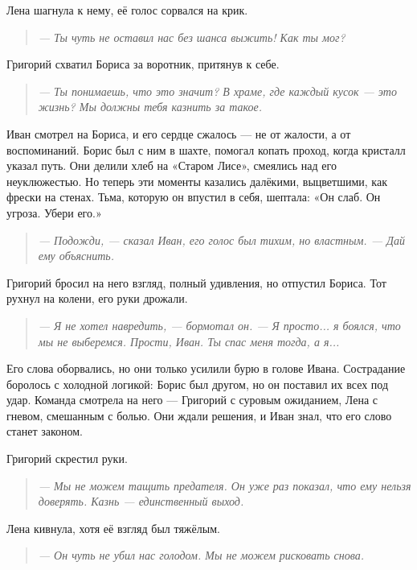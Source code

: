 \documentclass[12pt,a4paper]{book}
\newenvironment{dialogue}{\begin{quote}\itshape}{\end{quote}} %
\begin{document}
Лена шагнула к нему, её голос сорвался на крик.

\begin{dialogue}
--- Ты чуть не оставил нас без шанса выжить! Как ты мог?
\end{dialogue}

Григорий схватил Бориса за воротник, притянув к себе.

\begin{dialogue}
--- Ты понимаешь, что это значит? В храме, где каждый кусок --- это жизнь? Мы должны тебя казнить за такое.
\end{dialogue}

Иван смотрел на Бориса, и его сердце сжалось --- не от жалости, а от воспоминаний. Борис был с ним в шахте, помогал копать проход, когда кристалл указал путь. Они делили хлеб на «Старом Лисе», смеялись над его неуклюжестью. Но теперь эти моменты казались далёкими, выцветшими, как фрески на стенах. Тьма, которую он впустил в себя, шептала: «Он слаб. Он угроза. Убери его.»

\begin{dialogue}
--- Подожди, --- сказал Иван, его голос был тихим, но властным. --- Дай ему объяснить.
\end{dialogue}

Григорий бросил на него взгляд, полный удивления, но отпустил Бориса. Тот рухнул на колени, его руки дрожали.

\begin{dialogue}
--- Я не хотел навредить, --- бормотал он. --- Я просто... я боялся, что мы не выберемся. Прости, Иван. Ты спас меня тогда, а я...
\end{dialogue}

Его слова оборвались, но они только усилили бурю в голове Ивана. Сострадание боролось с холодной логикой: Борис был другом, но он поставил их всех под удар. Команда смотрела на него --- Григорий с суровым ожиданием, Лена с гневом, смешанным с болью. Они ждали решения, и Иван знал, что его слово станет законом.

Григорий скрестил руки.

\begin{dialogue}
--- Мы не можем тащить предателя. Он уже раз показал, что ему нельзя доверять. Казнь --- единственный выход.
\end{dialogue}

Лена кивнула, хотя её взгляд был тяжёлым.

\begin{dialogue}
--- Он чуть не убил нас голодом. Мы не можем рисковать снова.
\end{dialogue}
\end{document}
